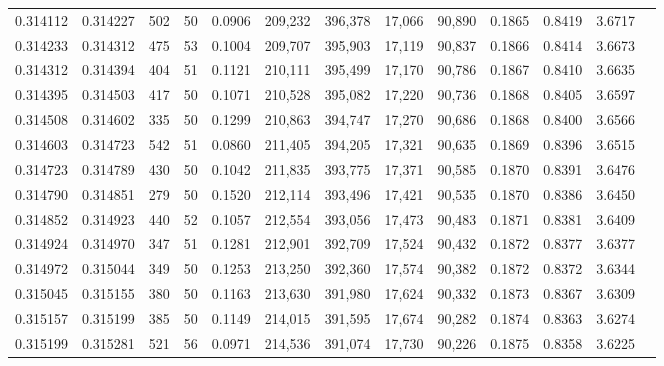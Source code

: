 \begin{tabular}{rrrrrrrrrrrrr}
0.314112 & 0.314227 &   502 &  50 &                                     0.0906 & 209,232 & 396,378 &  17,066 &  90,890 & 0.1865 & 0.8419 & 3.6717 \\
0.314233 & 0.314312 &   475 &  53 &                                     0.1004 & 209,707 & 395,903 &  17,119 &  90,837 & 0.1866 & 0.8414 & 3.6673 \\
0.314312 & 0.314394 &   404 &  51 &                                     0.1121 & 210,111 & 395,499 &  17,170 &  90,786 & 0.1867 & 0.8410 & 3.6635 \\
0.314395 & 0.314503 &   417 &  50 &                                     0.1071 & 210,528 & 395,082 &  17,220 &  90,736 & 0.1868 & 0.8405 & 3.6597 \\
0.314508 & 0.314602 &   335 &  50 &                                     0.1299 & 210,863 & 394,747 &  17,270 &  90,686 & 0.1868 & 0.8400 & 3.6566 \\
0.314603 & 0.314723 &   542 &  51 &                                     0.0860 & 211,405 & 394,205 &  17,321 &  90,635 & 0.1869 & 0.8396 & 3.6515 \\
0.314723 & 0.314789 &   430 &  50 &                                     0.1042 & 211,835 & 393,775 &  17,371 &  90,585 & 0.1870 & 0.8391 & 3.6476 \\
0.314790 & 0.314851 &   279 &  50 &                                     0.1520 & 212,114 & 393,496 &  17,421 &  90,535 & 0.1870 & 0.8386 & 3.6450 \\
0.314852 & 0.314923 &   440 &  52 &                                     0.1057 & 212,554 & 393,056 &  17,473 &  90,483 & 0.1871 & 0.8381 & 3.6409 \\
0.314924 & 0.314970 &   347 &  51 &                                     0.1281 & 212,901 & 392,709 &  17,524 &  90,432 & 0.1872 & 0.8377 & 3.6377 \\
0.314972 & 0.315044 &   349 &  50 &                                     0.1253 & 213,250 & 392,360 &  17,574 &  90,382 & 0.1872 & 0.8372 & 3.6344 \\
0.315045 & 0.315155 &   380 &  50 &                                     0.1163 & 213,630 & 391,980 &  17,624 &  90,332 & 0.1873 & 0.8367 & 3.6309 \\
0.315157 & 0.315199 &   385 &  50 &                                     0.1149 & 214,015 & 391,595 &  17,674 &  90,282 & 0.1874 & 0.8363 & 3.6274 \\
0.315199 & 0.315281 &   521 &  56 &                                     0.0971 & 214,536 & 391,074 &  17,730 &  90,226 & 0.1875 & 0.8358 & 3.6225 \\

\end{tabular}
